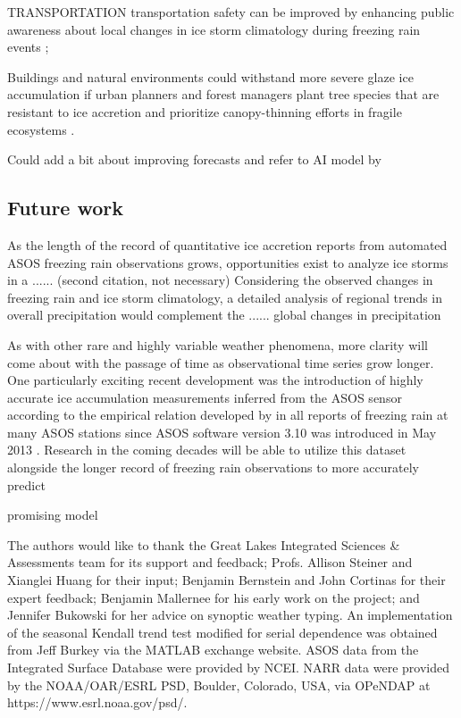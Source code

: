 \documentclass[twocol]{ametsoc}
\begin{document}
TRANSPORTATION 
transportation safety can be improved by enhancing public awareness about local changes in ice storm climatology during freezing rain events \citep{call2009assessment}; 


Buildings and natural environments could withstand more severe glaze ice accumulation if urban planners and forest managers plant tree species that are resistant to ice accretion and prioritize canopy-thinning efforts in fragile ecosystems \citep{hauer2006trees}.

Could add a bit about improving forecasts and refer to AI model by \citet{swaminathan2015modeling}

\subsection{Future work}
As the length of the record of quantitative ice accretion reports from automated ASOS freezing rain observations grows, opportunities exist to analyze ice storms in a ...... \citet{ryerson2007quantitative} (second citation, not necessary)
Considering the observed changes in freezing rain and ice storm climatology, a detailed analysis of regional trends in overall precipitation would complement the ...... global changes in precipitation \citet{westra2013global}

As with other rare and highly variable weather phenomena, more clarity will come about with the passage of time as observational time series grow longer. One particularly exciting recent development was the introduction of highly accurate ice accumulation measurements inferred from the ASOS sensor according to the empirical relation developed by \cite{ryerson2007quantitative} in all reports of freezing rain at many ASOS stations since ASOS software version 3.10 was introduced in May 2013 \citep{nws2013}. Research in the coming decades will be able to utilize this dataset alongside the longer record of freezing rain observations to more accurately predict 


\citet{sanders2016analysis} promising model



%
\acknowledgments
The authors would like to thank the Great Lakes Integrated Sciences \& Assessments team for its support and feedback; Profs. Allison Steiner and Xianglei Huang for their input; Benjamin Bernstein and John Cortinas for their expert feedback; Benjamin Mallernee for his early work on the project; and Jennifer Bukowski for her advice on synoptic weather typing. An implementation of the seasonal Kendall trend test modified for serial dependence was obtained from Jeff Burkey via the MATLAB exchange website. ASOS data from the Integrated Surface Database were provided by NCEI. NARR data were provided by the NOAA/OAR/ESRL PSD, Boulder, Colorado, USA, via OPeNDAP at https://www.esrl.noaa.gov/psd/.  
\end{document}
